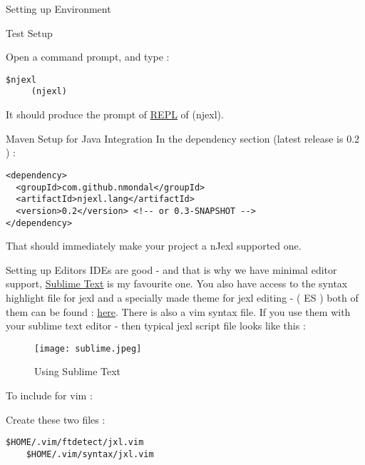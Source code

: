 \begin{section}{Setting up Environment}
\begin{subsection}{Test Setup}

Open a command prompt, and type :

\begin{lstlisting}[style=all]
     $njexl 
     (njexl)
\end{lstlisting}     

It should produce the prompt of \href{https://en.wikipedia.org/wiki/Read?eval?print_loop}{REPL} of (njexl).

\end{subsection} 

\begin{subsection}{Maven Setup for Java Integration}
In the dependency section (latest release is 0.2 ) : 

\begin{lstlisting}[style=all]
<dependency>
  <groupId>com.github.nmondal</groupId>
  <artifactId>njexl.lang</artifactId>
  <version>0.2</version> <!-- or 0.3-SNAPSHOT -->
</dependency>
\end{lstlisting}

That should immediately make your project a nJexl supported one. 
\end{subsection} 


\begin{subsection}{Setting up Editors}
IDEs are good - and that is why we have minimal editor support, \href{http://www.sublimetext.com}{Sublime Text} is my favourite one. 
You also have access to the syntax highlight file for jexl and a specially made theme for jexl editing - ( ES ) both of them can be found :   \href{https://github.com/nmondal/njexl/tree/master/doc}{here}. 
There is also a vim syntax file.
If you use them with your sublime text editor - then typical jexl script file looks like this : 

\begin{figure}
\begin{center}
\leavevmode
\texttt{[image: sublime.jpeg]}
\end{center}
\caption{Using Sublime Text}
\label{fig_2_1}
\end{figure}

To include for vim :

Create these two files :

\begin{lstlisting}[style=all]
    $HOME/.vim/ftdetect/jxl.vim
    $HOME/.vim/syntax/jxl.vim
\end{lstlisting}


\end{subsection}
\end{section}
